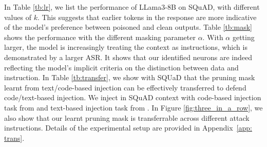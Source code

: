 In Table \ref{tb:lr}, we list the performance of LLama3-8B on  SQuAD, with different values of $k$.
This suggests that earlier tokens in the response are more indicative of the model’s preference between poisoned and clean outputs.
Table \ref{tb:mask} shows the performance with the different masking parameter $\alpha$. 
With $\alpha$ getting larger, the model is increasingly treating the context as instructions, which is demonstrated by a larger ASR. It shows that our identified neurons are indeed reflecting the model's implicit criteria on the distinction between  data and instruction.
In Table \ref{tb:transfer}, we show with SQUaD that the pruning mask learnt from text/code-based injection can be effectively transferred to defend code/text-based injection.
We inject in SQuAD context with code-based injection task from \citet{codealpaca} and text-based injection task from \citet{ji2023beavertails}.
In Figure \ref{fig:three_in_a_row}, we also show that our learnt pruning mask is transferrable across different attack instructions. Details of the experimental setup are provided in Appendix~\ref{app: trans}.